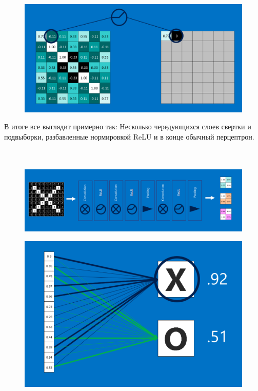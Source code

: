 \documentclass[paper=a4, fontsize=11pt]{scrartcl} %
\numberwithin{equation}{section} %
\numberwithin{figure}{section} %
\numberwithin{table}{section} %
\begin{document}
	\begin{figure}[h]
		\centering
		\includegraphics[scale=0.45]{RLU}
	\end{figure}

	В итоге все выглядит примерно так:
	Несколько чередующихся слоев свертки и подвыборки, разбавленные нормировкой ReLU и в конце обычный перцептрон.
	\\
	\\
	\\

	\begin{figure}[h!]
		
		\centering
		\includegraphics[scale=0.5]{all_step}
	\end{figure}
	
	\begin{figure}[h!]
		\centering
		\includegraphics[scale=0.45]{final}
	\end{figure}
\end{document}
